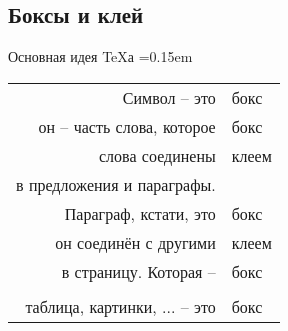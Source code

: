 \subsection{Боксы и клей}
\begin{frame}{Основная идея \TeX а}\relax
    \centering \large
    \tabcolsep=0.15em
    \begin{tabular}{r>{\ccsc}l}
         Символ -- это & бокс\\
         он -- часть слова, которое & бокс\\ 
         слова соединены & клеем\\ 
         в предложения и параграфы.&\\ 
         Параграф, кстати, это & бокс\\
         он соединён с другими & клеем\\
         в страницу. Которая -- & бокс\\
         &\\ 
         таблица, картинки, ... -- это & бокс 
    \end{tabular}
    
\end{frame}


